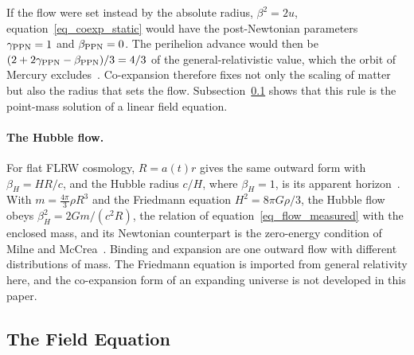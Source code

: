 \documentclass{iopjournal}
\begin{document}
If the flow were set instead by the absolute radius, $\beta^2=2u$, equation~\eqref{eq_coexp_static} would have the post-Newtonian parameters $\gamma_{\rm PPN}=1$ and $\beta_{\rm PPN}=0$. The perihelion advance would then be $(2+2\gamma_{\rm PPN}-\beta_{\rm PPN})/3=4/3$ of the general-relativistic value, which the orbit of Mercury excludes~\cite{Will2014}. Co-expansion therefore fixes not only the scaling of matter but also the radius that sets the flow. Subsection~\ref{sec_field_equation} shows that this rule is the point-mass solution of a linear field equation.

\paragraph{The Hubble flow.} For flat FLRW cosmology, $R=a(t)r$ gives the same outward form with $\beta_H=HR/c$, and the Hubble radius $c/H$, where $\beta_H=1$, is its apparent horizon~\cite{Faraoni2011,Faraoni2022}. With $m=\tfrac{4\pi}{3}\rho R^3$ and the Friedmann equation $H^2=8\pi G\rho/3$, the Hubble flow obeys $\beta_H^2=2Gm/(c^2R)$, the relation of equation~\eqref{eq_flow_measured} with the enclosed mass, and its Newtonian counterpart is the zero-energy condition of Milne and McCrea~\cite{Milne1934,McCreaMilne1934}. Binding and expansion are one outward flow with different distributions of mass. The Friedmann equation is imported from general relativity here, and the co-expansion form of an expanding universe is not developed in this paper.

\subsection{The Field Equation}\label{sec_field_equation}
\end{document}

